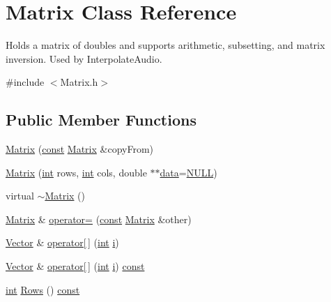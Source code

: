 \hypertarget{class_matrix}{}\section{Matrix Class Reference}
\label{class_matrix}


Holds a matrix of doubles and supports arithmetic, subsetting, and matrix inversion. Used by Interpolate\+Audio.  




{\ttfamily \#include $<$Matrix.\+h$>$}

\subsection*{Public Member Functions}
\begin{DoxyCompactItemize}
\item 
\hyperlink{class_matrix_a2a090db2c88b7117d6be454aefd6d34d}{Matrix} (\hyperlink{getopt1_8c_a2c212835823e3c54a8ab6d95c652660e}{const} \hyperlink{class_matrix}{Matrix} \&copy\+From)
\item 
\hyperlink{class_matrix_aa01361959c35e56f45e210abc6952649}{Matrix} (\hyperlink{xmltok_8h_a5a0d4a5641ce434f1d23533f2b2e6653}{int} rows, \hyperlink{xmltok_8h_a5a0d4a5641ce434f1d23533f2b2e6653}{int} cols, double $\ast$$\ast$\hyperlink{lib_2expat_8h_ac39e72a1de1cb50dbdc54b08d0432a24}{data}=\hyperlink{px__mixer_8h_a070d2ce7b6bb7e5c05602aa8c308d0c4}{N\+U\+LL})
\item 
virtual \hyperlink{class_matrix_a9b1c3627f573d78a2f08623fdfef990f}{$\sim$\+Matrix} ()
\item 
\hyperlink{class_matrix}{Matrix} \& \hyperlink{class_matrix_a3e40db12ae78b7616ee3f099bb15f13d}{operator=} (\hyperlink{getopt1_8c_a2c212835823e3c54a8ab6d95c652660e}{const} \hyperlink{class_matrix}{Matrix} \&other)
\item 
\hyperlink{class_vector}{Vector} \& \hyperlink{class_matrix_aa003e1b32017f269672db252d8c421a9}{operator\mbox{[}$\,$\mbox{]}} (\hyperlink{xmltok_8h_a5a0d4a5641ce434f1d23533f2b2e6653}{int} \hyperlink{checksum_8c_ab80e330a3bc9e38c1297fe17381e92b4}{i})
\item 
\hyperlink{class_vector}{Vector} \& \hyperlink{class_matrix_a0023b4d8a4be2bd07bcdb8bf0f78ee21}{operator\mbox{[}$\,$\mbox{]}} (\hyperlink{xmltok_8h_a5a0d4a5641ce434f1d23533f2b2e6653}{int} \hyperlink{checksum_8c_ab80e330a3bc9e38c1297fe17381e92b4}{i}) \hyperlink{getopt1_8c_a2c212835823e3c54a8ab6d95c652660e}{const} 
\item 
\hyperlink{xmltok_8h_a5a0d4a5641ce434f1d23533f2b2e6653}{int} \hyperlink{class_matrix_adc52ae10fdf495191d3267d658978772}{Rows} () \hyperlink{getopt1_8c_a2c212835823e3c54a8ab6d95c652660e}{const} 
$$
\end{DoxyCompactItemize}

